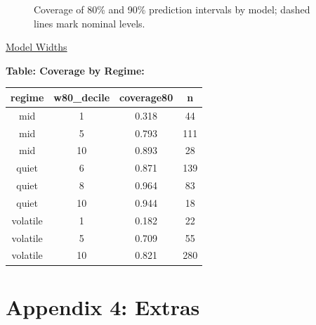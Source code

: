 \documentclass[
  a4paper,
  DIV=11,
  numbers=noendperiod]{scrreprt}
\begin{document}
\begin{figure}


\caption{\label{fig-coverage-by-model}Coverage of 80\% and 90\%
prediction intervals by model; dashed lines mark nominal levels.}

\end{figure}%

\label{fig-widths}\href{paper/figures/raw/fig-width-distributions.pdf}{Model
Widths}

\textbf{Table: Coverage by Regime:}

\begin{longtable}[]{@{}cccc@{}}
\toprule\noalign{}
regime & w80\_decile & coverage80 & n \\
\midrule\noalign{}
\endhead
\bottomrule\noalign{}
\endlastfoot
mid & 1 & 0.318 & 44 \\
mid & 5 & 0.793 & 111 \\
mid & 10 & 0.893 & 28 \\
quiet & 6 & 0.871 & 139 \\
quiet & 8 & 0.964 & 83 \\
quiet & 10 & 0.944 & 18 \\
volatile & 1 & 0.182 & 22 \\
volatile & 5 & 0.709 & 55 \\
volatile & 10 & 0.821 & 280 \\
\end{longtable}

\chapter{Appendix 4: Extras}\label{appendix-4-extras}
\end{document}
